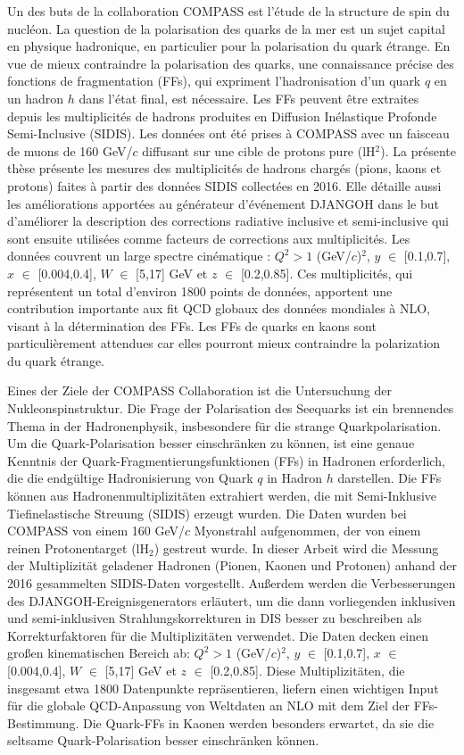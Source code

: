 Un des buts de la collaboration COMPASS est l'étude de la structure de spin du nucléon. La question de la polarisation des quarks de la mer est un sujet capital en physique hadronique, en particulier pour la polarisation du quark étrange. En vue de mieux contraindre la polarisation des quarks, une connaissance précise des fonctions de fragmentation (FFs), qui expriment l'hadronisation d'un quark $q$ en un hadron $h$ dans l'état final, est nécessaire. Les FFs peuvent être extraites depuis les multiplicités de hadrons produites en Diffusion Inélastique Profonde Semi-Inclusive (SIDIS). Les données ont été prises à COMPASS avec un faisceau de muons de 160 GeV/$c$ diffusant sur une cible de protons pure (lH$^2$). La présente thèse présente les mesures des multiplicités de hadrons chargés (pions, kaons et protons) faites à partir des données SIDIS collectées en 2016. Elle détaille aussi les améliorations apportées au générateur d'événement DJANGOH dans le but d'améliorer la description des corrections radiative inclusive et semi-inclusive qui sont ensuite utilisées comme facteurs de corrections aux multiplicités. Les données couvrent un large spectre cinématique : $Q^2 > 1$ (GeV/$c$)$^2$, $y$ $\in$ [0.1,0.7], $x$ $\in$ [0.004,0.4], $W$ $\in$ [5,17] GeV et $z$ $\in$ [0.2,0.85]. Ces multiplicités, qui représentent un total d'environ 1800 points de données, apportent une contribution importante aux fit QCD globaux des données mondiales à NLO, visant à la détermination des FFs. Les FFs de quarks en kaons sont particulièrement attendues car elles pourront mieux contraindre la polarization du quark étrange.

\newpage

Eines der Ziele der COMPASS Collaboration ist die Untersuchung der Nukleonspinstruktur. Die Frage der Polarisation des Seequarks ist ein brennendes Thema in der Hadronenphysik, insbesondere für die strange Quarkpolarisation. Um die Quark-Polarisation besser einschränken zu können, ist eine genaue Kenntnis der Quark-Fragmentierungsfunktionen (FFs) in Hadronen erforderlich, die die endgültige Hadronisierung von Quark $q$ in Hadron $h$ darstellen. Die FFs können aus Hadronenmultiplizitäten extrahiert werden, die mit Semi-Inklusive Tiefinelastische Streuung (SIDIS) erzeugt wurden. Die Daten wurden bei COMPASS von einem 160 GeV/$c$ Myonstrahl aufgenommen, der von einem reinen Protonentarget (lH$_2$) gestreut wurde. In dieser Arbeit wird die Messung der Multiplizität geladener Hadronen (Pionen, Kaonen und Protonen) anhand der 2016 gesammelten SIDIS-Daten vorgestellt. Außerdem werden die Verbesserungen des DJANGOH-Ereignisgenerators erläutert, um die dann vorliegenden inklusiven und semi-inklusiven Strahlungskorrekturen in DIS besser zu beschreiben als Korrekturfaktoren für die Multiplizitäten verwendet. Die Daten decken einen großen kinematischen Bereich ab:  $Q^2 > 1$ (GeV/$c$)$^2$, $y$ $\in$ [0.1,0.7], $x$ $\in$ [0.004,0.4], $W$ $\in$ [5,17] GeV et $z$ $\in$ [0.2,0.85]. Diese Multiplizitäten, die insgesamt etwa 1800 Datenpunkte repräsentieren, liefern einen wichtigen Input für die globale QCD-Anpassung von Weltdaten an NLO mit dem Ziel der FFs-Bestimmung. Die Quark-FFs in Kaonen werden besonders erwartet, da sie die seltsame Quark-Polarisation besser einschränken können.

